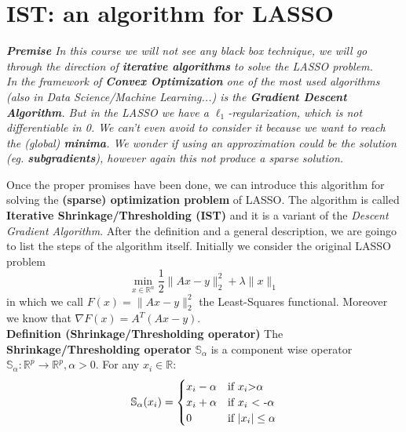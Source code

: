 \section{IST: an algorithm for LASSO}
\noindent
{\color{blue}
\textit{
    \textbf{Premise} In this course we will not see any black box technique, we will go through the direction of \textbf{iterative algorithms} to solve the LASSO problem.\\
    \noindent
    In the framework of \textbf{Convex Optimization} one of the most used algorithms (also in Data Science/Machine Learning...) is the \textbf{Gradient Descent Algorithm}. But in the LASSO we have a $\ell_1$-regularization, which is not differentiable in 0. We can't even avoid to consider it because we want to reach the (global) \textbf{minima}. We wonder if using an approximation could be the solution (eg. \textbf{subgradients}), however again this not produce a \textit{sparse solution}. 
}\\
}

\noindent
Once the proper promises have been done, we can introduce this algorithm for solving the \textbf{(sparse) optimization problem} of LASSO. 
The algorithm is called \textbf{Iterative Shrinkage/Thresholding (IST)} and it is a variant of the \textit{Descent Gradient Algorithm}. After the definition and a general description, we are goingo to list the steps of the algorithm itself. Initially we consider the original LASSO problem
$$\min_{x\in\mathbb{R}^n} \frac{1}{2}\lVert Ax-y \rVert_2^2+\lambda\lVert x \rVert_1$$ in which we call $F(x)=\lVert Ax-y \rVert_2^2$ the Least-Squares functional. Moreover we know that $\nabla F(x) = A^T(Ax-y)$.\\

\noindent
\textbf{Definition (Shrinkage/Thresholding operator)} The \textbf{Shrinkage/Thresholding operator} $\mathbb{S}_{\alpha}$ is a component wise operator $\mathbb{S}_{\alpha}: \mathbb{R}^p \rightarrow \mathbb{R}^p, \alpha >0$. For any $x_i\in \mathbb{R}$:
\begin{equation*}
    \mathbb{S}_{\alpha}(x_i) =
        \begin{cases}
            x_i-\alpha & \text{if $x_i$>$\alpha$} \\
            x_i+\alpha & \text{if $x_i$ < -$\alpha$}\\
            0 & \text{if $ \lvert x_i \rvert \le \alpha$}\\ 
        \end{cases}
\end{equation*}



